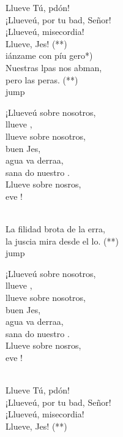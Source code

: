 \begin{cancion}%
	Llueve Tú, pdón!\\
	¡Llueveú, por tu bad, Señor!\\
	¡Llueveú, misecordia!\\
	Llueve, Jes! (**)  \\
	iánzame con píu gero*) \\
	Nuestras lpas nos abman,\\
	pero  las peras. (**) \\jump\\
	\begin{chorus}%
	¡Llueveú sobre nosotros,\\
	llueve , \\
	llueve  sobre nosotros, \\
	buen Jes,\\
	agua va derraa,\\
	sana do nuestro .\\
	Llueve  sobre nosros, \\
	eve ! \\
	\end{chorus}%
	\jump\\
	La filidad brota de la erra,\\
	la juscia mira desde el lo. (**)\\jump\\
	\begin{chorus}%
	¡Llueveú sobre nosotros,\\
	llueve , \\
	llueve  sobre nosotros, \\
	buen Jes,\\
	agua va derraa,\\
	sana do nuestro .\\
	Llueve  sobre nosros, \\
	eve ! \\
	\end{chorus}%
	\jump\\
	Llueve Tú, pdón!\\
	¡Llueveú, por tu bad, Señor!\\
	¡Llueveú, misecordia!\\
	Llueve, Jes! (**)  \\
\end{cancion}%
